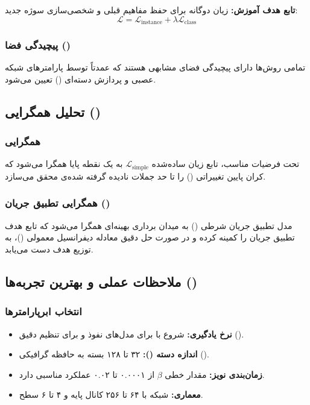 \begin{latin}
\textbf{تابع هدف آموزش:} زیان دوگانه برای حفظ مفاهیم قبلی و شخصی‌سازی سوژه جدید:
\begin{equation}
\mathcal{L} = \mathcal{L}_{\text{instance}} + \lambda \mathcal{L}_{\text{class}}
\end{equation}


\subsubsection{پیچیدگی فضا ()}
تمامی روش‌ها دارای پیچیدگی فضای مشابهی هستند که عمدتاً توسط پارامترهای شبکه عصبی و پردازش دسته‌ای () تعیین می‌شود.

\subsection{تحلیل همگرایی ()}

\subsubsection{همگرایی }
تحت فرضیات مناسب، تابع زیان ساده‌شده $\mathcal{L}_{\text{simple}}$ به یک نقطه پایا همگرا می‌شود که کران پایین تغییراتی () را تا حد جملات نادیده گرفته شده‌ی  محقق می‌سازد.

\subsubsection{همگرایی تطبیق جریان ()}
مدل تطبیق جریان شرطی () به میدان برداری بهینه‌ای همگرا می‌شود که تابع هدف تطبیق جریان را کمینه کرده و در صورت حل دقیق معادله دیفرانسیل معمولی ()، به توزیع هدف دست می‌یابد.



\subsection{ملاحظات عملی و بهترین تجربه‌ها ()}

\subsubsection{انتخاب ابرپارامترها}
\begin{itemize}
    \item \textbf{نرخ یادگیری:} شروع با  برای مدل‌های نفوذ و  برای تنظیم دقیق ().
    \item \textbf{اندازه دسته ():} ۳۲ تا ۱۲۸ بسته به حافظه گرافیکی ().
    \item \textbf{زمان‌بندی نویز:} مقدار خطی $\beta$ از ۰.۰۰۰۱ تا ۰.۰۲ عملکرد مناسبی دارد.
    \item \textbf{معماری:} شبکه  با ۶۴ تا ۲۵۶ کانال پایه و ۴ تا ۶ سطح.
\end{itemize}


\end{latin}

